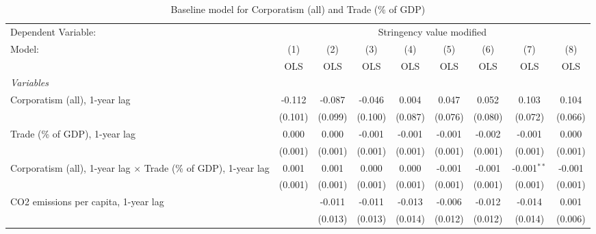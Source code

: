 
\begin{table}[htbp]
   \caption{Baseline model for Corporatism (all) and Trade (\% of GDP)}
   \centering
   \begin{tabular}{lcccccccc}
      \toprule
      Dependent Variable: & \multicolumn{8}{c}{Stringency value modified}\\
      Model:                                                                 & (1)     & (2)     & (3)          & (4)          & (5)           & (6)           & (7)           & (8)\\  
                                                                             &  OLS    & OLS     & OLS          & OLS          & OLS           & OLS           & OLS           & OLS\\  
      \midrule
      \emph{Variables}\\
      Corporatism (all), 1-year lag                                          & -0.112  & -0.087  & -0.046       & 0.004        & 0.047         & 0.052         & 0.103         & 0.104\\   
                                                                             & (0.101) & (0.099) & (0.100)      & (0.087)      & (0.076)       & (0.080)       & (0.072)       & (0.066)\\   
      Trade (\% of GDP), 1-year lag                                          & 0.000   & 0.000   & -0.001       & -0.001       & -0.001        & -0.002        & -0.001        & 0.000\\   
                                                                             & (0.001) & (0.001) & (0.001)      & (0.001)      & (0.001)       & (0.001)       & (0.001)       & (0.001)\\   
      Corporatism (all), 1-year lag $\times$ Trade (\% of GDP), 1-year lag   & 0.001   & 0.001   & 0.000        & 0.000        & -0.001        & -0.001        & -0.001$^{**}$ & -0.001\\   
                                                                             & (0.001) & (0.001) & (0.001)      & (0.001)      & (0.001)       & (0.001)       & (0.001)       & (0.001)\\   
      CO2 emissions per capita, 1-year lag                                   &         & -0.011  & -0.011       & -0.013       & -0.006        & -0.012        & -0.014        & 0.001\\   
                                                                             &         & (0.013) & (0.013)      & (0.014)      & (0.012)       & (0.012)       & (0.014)       & (0.006)\\   

\end{tabular}
\end{table}
